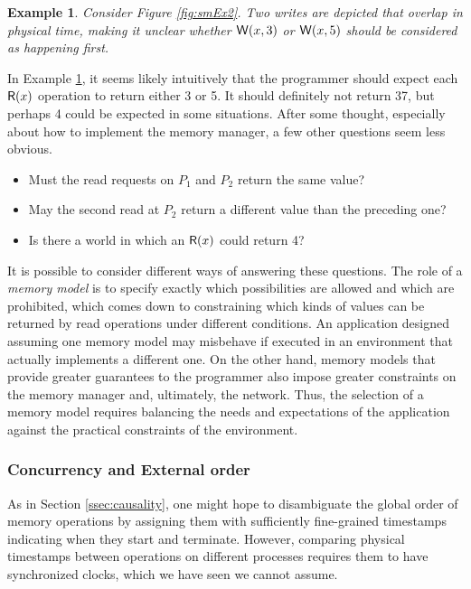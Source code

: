 \documentclass[]             %
{NASA}                       %
\newtheorem{example}{Example}
\theoremstyle{definition}
\begin{document}
\begin{example}
  \label{exmpl:concurrentupdates}
  Consider Figure \ref{fig:smEx2}. Two writes are depicted that overlap
  in physical time, making it unclear whether $\mathsf{W}\!\left(x, 3\right)$ or $\mathsf{W}\!\left(x, 5\right)$
  should be considered as happening first.
\end{example}

In Example \ref{exmpl:concurrentupdates}, it seems likely intuitively
that the programmer should expect each $\mathsf{R}\!\left(x\right)$ operation to return
either 3 or 5. It should definitely not return 37, but perhaps 4 could
be expected in some situations. After some thought, especially about
how to implement the memory manager, a few other questions seem less
obvious.
\begin{itemize}
\item Must the read requests on $P_1$ and $P_2$ return the same value?
\item May the second read at $P_2$ return a different value
  than the preceding one?
\item Is there a world in which an $\mathsf{R}\!\left(x\right)$ could return 4?
\end{itemize}

It is possible to consider different ways of answering these
questions. The role of a \emph{memory model} is to specify exactly
which possibilities are allowed and which are prohibited, which comes
down to constraining which kinds of values can be returned by read
operations under different conditions. An application designed
assuming one memory model may misbehave if executed in an environment
that actually implements a different one. On the other hand, memory
models that provide greater guarantees to the programmer also impose
greater constraints on the memory manager and, ultimately, the
network. Thus, the selection of a memory model requires balancing the
needs and expectations of the application against the practical
constraints of the environment.

\subsubsection{Concurrency and External order}
\label{ssec:externalorder}
As in Section \ref{ssec:causality}, one might hope to disambiguate
the global order of memory operations by assigning them with
sufficiently fine-grained timestamps indicating when they start and
terminate. However, comparing physical timestamps between operations
on different processes requires them to have synchronized clocks,
which we have seen we cannot assume.
\end{document}
